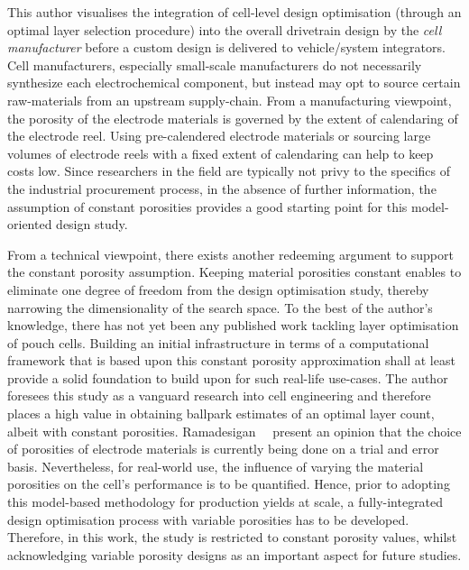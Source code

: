 This  author  visualises  the  integration  of  cell-level  design  optimisation
(through  an optimal  layer  selection procedure)  into  the overall  drivetrain
design  by the  \emph{cell manufacturer}  before  a custom  design is  delivered
to  vehicle/system  integrators.   Cell  manufacturers,  especially  small-scale
manufacturers do not necessarily  synthesize each electrochemical component, but
instead may opt  to source certain raw-materials from  an upstream supply-chain.
From  a  manufacturing  viewpoint,  the  porosity  of  the  electrode  materials
is  governed  by  the  extent  of  calendaring  of  the  electrode  reel.  Using
pre-calendered electrode materials or sourcing  large volumes of electrode reels
with a fixed extent of calendaring can help to keep costs low. Since researchers
in  the  field are  typically  not  privy to  the  specifics  of the  industrial
procurement process,  in the absence  of further information, the  assumption of
constant  porosities provides  a  good starting  point  for this  model-oriented
design study.

From a technical  viewpoint, there exists another redeeming  argument to support
the constant  porosity assumption. Keeping material  porosities constant enables
to  eliminate  one  degree  of  freedom  from  the  design  optimisation  study,
thereby narrowing  the dimensionality of  the search space.  To the best  of the
author's knowledge,  there has not  yet been  any published work  tackling layer
optimisation  of  pouch  cells.  Building an  initial  infrastructure  in  terms
of  a  computational  framework  that  is  based  upon  this  constant  porosity
approximation  shall at  least  provide a  solid foundation  to  build upon  for
such  real-life  use-cases.  The  author  foresees  this  study  as  a  vanguard
research into  cell engineering and therefore  places a high value  in obtaining
ballpark estimates of  an optimal layer count, albeit  with constant porosities.
Ramadesigan~\etal~\cite{Ramadesigan2012} present  an opinion that the  choice of
porosities of electrode  materials is currently being done on  a trial and error
basis. Nevertheless, for  real-world use, the influence of  varying the material
porosities  on the  cell's  performance is  to be  quantified.  Hence, prior  to
adopting  this  model-based  methodology  for  production  yields  at  scale,  a
fully-integrated design optimisation process with  variable porosities has to be
developed. Therefore, in this work, the study is restricted to constant porosity
values, whilst  acknowledging variable porosity  designs as an  important aspect
for future studies.

